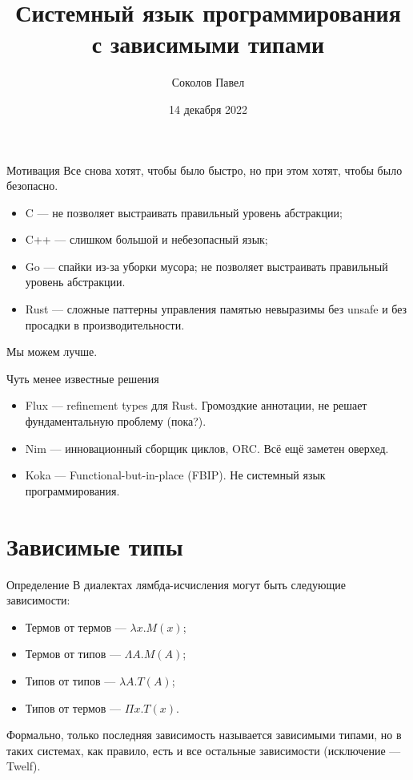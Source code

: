 \documentclass{beamer}
\title{Системный язык программирования с зависимыми типами}
\author{Соколов Павел}
\date{14 декабря 2022}
\begin{document}
\frame{\titlepage}

\begin{frame}{Мотивация}
  Все снова хотят, чтобы было быстро, но при этом хотят, чтобы было безопасно.
  \begin{itemize}
    \item C --- не позволяет выстраивать правильный уровень абстракции;
    \item C++ --- слишком большой и небезопасный язык;
    \item Go --- спайки из-за уборки мусора; не позволяет выстраивать правильный
      уровень абстракции.
    \item Rust --- сложные паттерны управления памятью невыразимы без unsafe и
      без просадки в производительности.
  \end{itemize}
  Мы можем лучше.
\end{frame}

\begin{frame}{Чуть менее известные решения}
  \begin{itemize}
    \item Flux --- refinement types для Rust. Громоздкие аннотации, не решает
      фундаментальную проблему (пока?).
    \item Nim --- инновационный сборщик циклов, ORC. Всё ещё заметен оверхед.
    \item Koka --- Functional-but-in-place (FBIP). Не системный язык
      программирования.
  \end{itemize}
\end{frame}

\section{Зависимые типы}

\frame{\sectionpage}

\begin{frame}{Определение}
  В диалектах лямбда-исчисления могут быть следующие зависимости:

  \begin{itemize}
    \item Термов от термов --- $\lambda x. M(x)$;
    \item Термов от типов --- $\Lambda A. M(A)$;
    \item Типов от типов --- $\lambda A. T(A)$;
    \item Типов от термов --- $\Pi x. T(x)$.
  \end{itemize}

  Формально, только последняя зависимость называется зависимыми типами, но в
  таких системах, как правило, есть и все остальные зависимости (исключение ---
  Twelf).
\end{frame}
\end{document}
